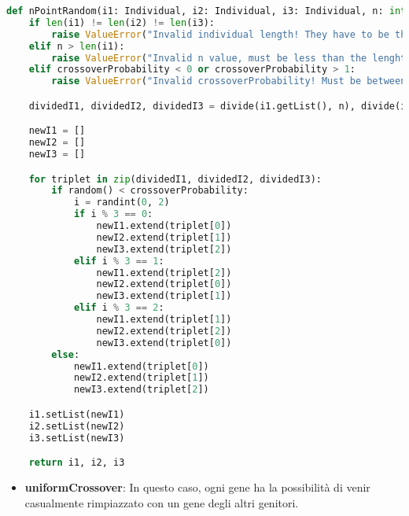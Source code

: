 \documentclass{article}
\begin{document}
\begin{lstlisting}[language=Python]
def nPointRandom(i1: Individual, i2: Individual, i3: Individual, n: int, crossoverProbability: float) -> tuple[Individual, Individual, Individual]:
    if len(i1) != len(i2) != len(i3):
        raise ValueError("Invalid individual length! They have to be the same.")
    elif n > len(i1):
        raise ValueError("Invalid n value, must be less than the lenght of the individual!")
    elif crossoverProbability < 0 or crossoverProbability > 1:
        raise ValueError("Invalid crossoverProbability! Must be between 0 and 1.")

    dividedI1, dividedI2, dividedI3 = divide(i1.getList(), n), divide(i2.getList(), n), divide(i3.getList(), n)

    newI1 = []
    newI2 = []
    newI3 = []

    for triplet in zip(dividedI1, dividedI2, dividedI3):
        if random() < crossoverProbability:
            i = randint(0, 2)
            if i % 3 == 0:
                newI1.extend(triplet[0])
                newI2.extend(triplet[1])
                newI3.extend(triplet[2])
            elif i % 3 == 1:
                newI1.extend(triplet[2])
                newI2.extend(triplet[0])
                newI3.extend(triplet[1])
            elif i % 3 == 2:
                newI1.extend(triplet[1])
                newI2.extend(triplet[2])
                newI3.extend(triplet[0])
        else:
            newI1.extend(triplet[0])
            newI2.extend(triplet[1])
            newI3.extend(triplet[2])

    i1.setList(newI1)
    i2.setList(newI2)
    i3.setList(newI3)

    return i1, i2, i3
        \end{lstlisting}

\pagebreak


\begin{itemize}
\item\textbf{uniformCrossover}: In questo caso, ogni gene ha la possibilità di venir casualmente rimpiazzato con un gene degli altri genitori.
\end{itemize}
\end{document}
